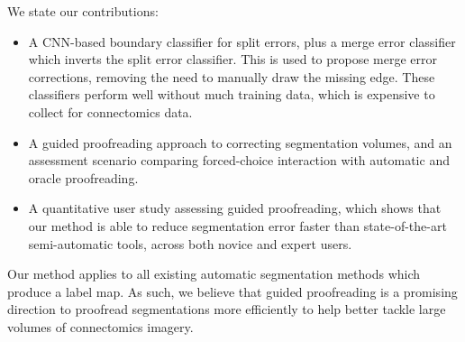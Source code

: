 We state our contributions:
\begin{itemize}
\item A CNN-based boundary classifier for split errors, plus a merge error classifier which inverts the split error classifier. This is used to propose merge error corrections, removing the need to manually draw the missing edge. These classifiers perform well without much training data, which is expensive to collect for connectomics data.
\item A guided proofreading approach to correcting segmentation volumes, and an assessment scenario comparing forced-choice interaction with automatic and oracle proofreading.
\item A quantitative user study assessing guided proofreading, which shows that our method is able to reduce segmentation error faster than state-of-the-art semi-automatic tools, across both novice and expert users.
\end{itemize}
Our method applies to all existing automatic segmentation methods which produce a label map. As such, we believe that guided proofreading is a promising direction to proofread segmentations more efficiently to help better tackle large volumes of connectomics imagery.

